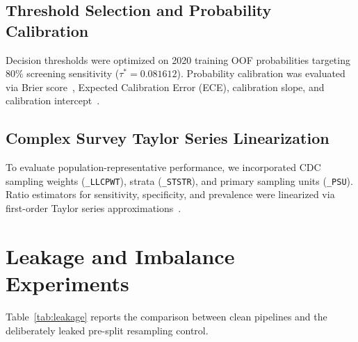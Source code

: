\documentclass[11pt,a4paper]{article}
\begin{document}
\subsection{Threshold Selection and Probability Calibration}
Decision thresholds were optimized on 2020 training OOF probabilities targeting $80\%$ screening sensitivity ($\tau^* = 0.081612$). Probability calibration was evaluated via Brier score~\cite{Brier1950_MWR}, Expected Calibration Error (ECE), calibration slope, and calibration intercept~\cite{VanCalster2019_BMCMed}.

\subsection{Complex Survey Taylor Series Linearization}
To evaluate population-representative performance, we incorporated CDC sampling weights (\texttt{\_LLCPWT}), strata (\texttt{\_STSTR}), and primary sampling units (\texttt{\_PSU}). Ratio estimators for sensitivity, specificity, and prevalence were linearized via first-order Taylor series approximations~\cite{Heeringa2017_Survey, Wolter2007_Variance, Lumley2004_Survey}.

\section{Leakage and Imbalance Experiments}

Table~\ref{tab:leakage} reports the comparison between clean pipelines and the deliberately leaked pre-split resampling control.
\end{document}
